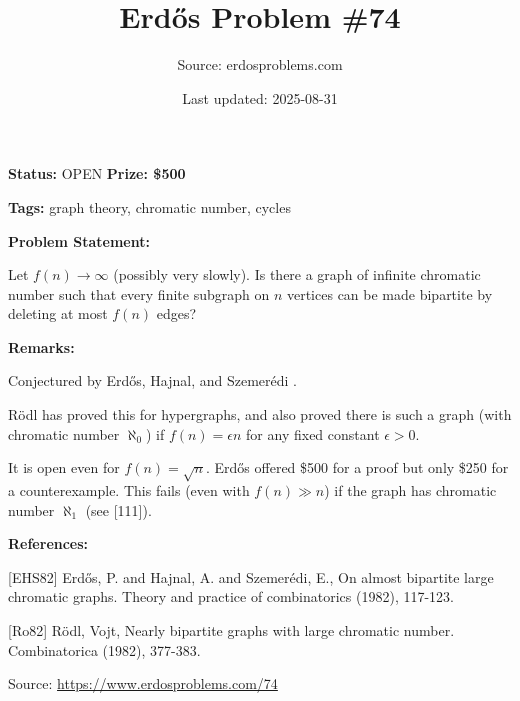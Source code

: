 \documentclass{article}
\title{Erd\H{o}s Problem \#74}
\date{Last updated: 2025-08-31}
\author{Source: erdosproblems.com}
\begin{document}
\maketitle

\noindent\textbf{Status:} OPEN \quad \textbf{Prize: \$500}

\noindent\textbf{Tags:} graph theory, chromatic number, cycles

\medskip
\noindent\textbf{Problem Statement:}

Let $f(n)\to \infty$ (possibly very slowly). Is there a graph of infinite chromatic number such that every finite subgraph on $n$ vertices can be made bipartite by deleting at most $f(n)$ edges?

\bigskip
\noindent\textbf{Remarks:}

Conjectured by Erd\H{o}s, Hajnal, and Szemer\'{e}di \cite{EHS82}. 

R\"{o}dl \cite{Ro82} has proved this for hypergraphs, and also proved there is such a graph (with chromatic number $\aleph_0$) if $f(n)=\epsilon n$ for any fixed constant $\epsilon>0$.

It is open even for $f(n)=\sqrt{n}$. Erd\H{o}s offered \$500 for a proof but only \$250 for a counterexample. This fails (even with $f(n)\gg n$) if the graph has chromatic number $\aleph_1$ (see [111]).

\bigskip
\noindent\textbf{References:}

[EHS82] Erd\H{o}s, P. and Hajnal, A. and Szemer\'{e}di, E., On almost bipartite large chromatic graphs. Theory and practice of combinatorics (1982), 117-123.
 
 [Ro82] R\"{o}dl, Vojt\vEch, Nearly bipartite graphs with large chromatic number. Combinatorica (1982), 377-383.

\bigskip
\noindent\small{Source: \url{https://www.erdosproblems.com/74}}
\end{document}
